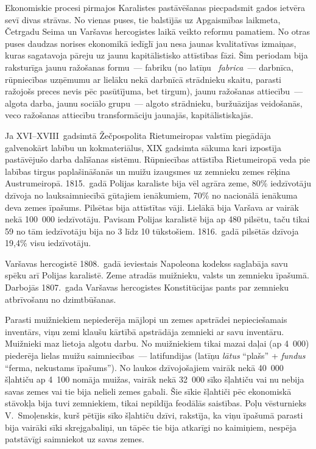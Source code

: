 \documentclass[twoside,a5paper,12pt,fleqn,openany]{extbook}
\newcommand{\latxti}[1]{\textit{\textlatin{#1}}}
\begin{document}
Ekonomiskie procesi pirmajos Karalistes pastāvēšanas piecpadsmit gados ietvēra sevī divas strāvas. No vienas puses, tie balstījās uz Apgaismības laikmeta, Četrgadu Seima un Varšavas hercogistes laikā veikto reformu pamatiem. No otras puses daudzas norises ekonomikā iedīglī jau nesa jaunas kvalitatīvas izmaiņas, kuras sagatavoja pāreju uz jaunu kapitālistisko attīstības fāzi. Šim periodam bija raksturīga jaunu ražošanas formu~--- fabriku (no latīņu ~\latxti{fabrica}~--- darbnīca, rūpniecības uzņēmumu ar lielāku nekā darbnīcā strādnieku skaitu, parasti ražojošs preces nevis pēc pasūtījuma, bet tirgum), jaunu ražošanas attiecību~--- algota darba, jaunu sociālo grupu~--- algoto strādnieku, buržuāzijas veidošanās, veco ražošanas attiecību transformāciju jaunajās, kapitālistiskajās.

Ja XVI--XVIII~gadsimtā Žečpospolita Rietumeiropas valstīm piegādāja galvenokārt labību un kokmateriālus, XIX gadsimta sākuma kari izpostīja pastāvējušo darba dalīšanas sistēmu. Rūpniecības attīstība Rietumeiropā veda pie labības tirgus paplašināšanās un muižu izaugsmes uz zemnieku zemes rēķina Austrumeiropā. 1815.~gadā Polijas karaliste bija vēl agrāra zeme, 80\% iedzīvotāju dzīvoja no lauksaimniecībā gūtajiem ienākumiem, 70\% no nacionālā ienākuma deva zemes īpašums. Pilsētas bija attīstītas vāji. Lielākā bija Varšava ar vairāk nekā 100~000 iedzīvotāju. Pavisam Polijas karalistē bija ap 480 pilsētu, taču tikai 59 no tām iedzīvotāju bija no 3 līdz 10 tūkstošiem. 1816.~gadā pilsētās dzīvoja 19,4\% visu iedzīvotāju.

Varšavas hercogistē 1808.~gadā ieviestais Napoleona kodekss saglabāja savu spēku arī Polijas karalistē. Zeme atradās muižnieku, valsts un zemnieku īpašumā. Darbojās 1807.~gada Varšavas hercogistes Konstitūcijas pants par zemnieku atbrīvošanu no dzimtbūšanas.

Parasti muižniekiem nepiederēja mājlopi un zemes apstrādei nepieciešamais inventārs, viņu zemi klaušu kārtībā apstrādāja zemnieki ar savu inventāru. Muižnieki maz lietoja algotu darbu. No muižniekiem tikai mazai daļai (ap 4~000) piederēja lielas muižu saimniecības~--- latifundijas (latīņu \latxti{lātus} ``plašs'' + \latxti{fundus} ``ferma, nekustams īpašums''). No laukos dzīvojošajiem vairāk nekā 40~000 šļahtiču ap 4~100 nomāja muižas, vairāk nekā 32~000 sīko šļahtiču vai nu nebija savas zemes vai tie bija nelieli zemes gabali. Šie sīkie šļahtiči pēc ekonomiskā stāvokļa bija tuvi zemniekiem, tikai nepildīja feodālās saistības. Poļu vēsturnieks V.~Smoļenskis, kurš pētījis sīko šļahtiču dzīvi, rakstīja, ka viņu īpašumā parasti bija vairāki sīki skrejgabaliņi, un tāpēc tie bija atkarīgi no kaimiņiem, nespēja patstāvīgi saimniekot uz savas zemes.
\end{document}

